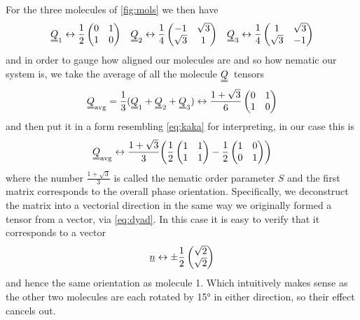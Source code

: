 \documentclass[a4paper,11pt]{article}
\newcommand{\suf}[2]{\stackunder[0.5pt]{\stackunder[1pt]{\ensuremath{#1}}{\rule{\widthof{\ensuremath{#2}}*\real{0.9}}{.1ex}}}{}}
\newcommand{\duf}[2]{\stackunder[0.5pt]{\stackunder[0.8pt]{\stackunder[1pt]{\ensuremath{#1}}{\rule{\widthof{\ensuremath{#2}}*\real{0.9}}{.1ex}}}{\rule{\widthof{\ensuremath{#2}}*\real{0.9}}{.1ex}}}{}}
\newcommand{\su}[1]{\suf{#1}{#1}}
\newcommand{\du}[1]{\duf{#1}{#1}}
\newcommand{\nn}{\ensuremath{\su{n}}}
\newcommand{\QQ}{\ensuremath{\du{Q}}}
\begin{document}
\begin{multicols}{2}
    For the three molecules of \cref{fig:mols} we then have
    \small
    \begin{align*}
        \QQ_1 \leftrightarrow \frac{1}{2}\begin{pmatrix} 0 & 1 \\ 1 & 0 \end{pmatrix} &&
        \QQ_2 \leftrightarrow \frac{1}{4}\begin{pmatrix} -1 & \sqrt{3} \\ \sqrt{3} & 1 \end{pmatrix} &&
        \QQ_3 \leftrightarrow \frac{1}{4}\begin{pmatrix} 1 & \sqrt{3} \\ \sqrt{3} & -1 \end{pmatrix}
    \end{align*}
    \normalsize
    and in order to gauge how aligned our molecules are and so how nematic our system is, we take the average of all the molecule \QQ\ tensors
    \begin{equation*}
        \QQ_\text{avg} = \frac{1}{3} (\QQ_1 + \QQ_2 + \QQ_3) \leftrightarrow \frac{1 + \sqrt{3}}{6} \begin{pmatrix} 0 & 1 \\ 1 & 0 \end{pmatrix}
    \end{equation*}
    and then put it in a form resembling \cref{eq:kaka} for interpreting, in our case this is
    \begin{equation*}
        \QQ_\text{avg} \leftrightarrow \frac{1+\sqrt{3}}{3}\qty(\frac{1}{2} \begin{pmatrix} 1 & 1 \\ 1 & 1 \end{pmatrix} - \frac{1}{2}\begin{pmatrix} 1 & 0 \\ 0 & 1 \end{pmatrix})
    \end{equation*}
    where the number $\frac{1+\sqrt{3}}{3}$ is called the nematic order parameter $S$ and the first matrix corresponds to the overall phase orientation.
    Specifically, we deconstruct the matrix into a vectorial direction in the same way we originally formed a tensor from a vector, via \cref{eq:dyad}.
    In this case it is easy to verify that it corresponds to a vector
    \begin{equation*}
        \nn \leftrightarrow \pm \frac{1}{2}\begin{pmatrix} \sqrt{2} \\ \sqrt{2}        \end{pmatrix}
    \end{equation*}
    and hence the same orientation as molecule 1.
    Which intuitively makes sense as the other two molecules are each rotated by 15\si{\degree} in either direction, so their effect cancels out.


\end{multicols}
\end{document}
